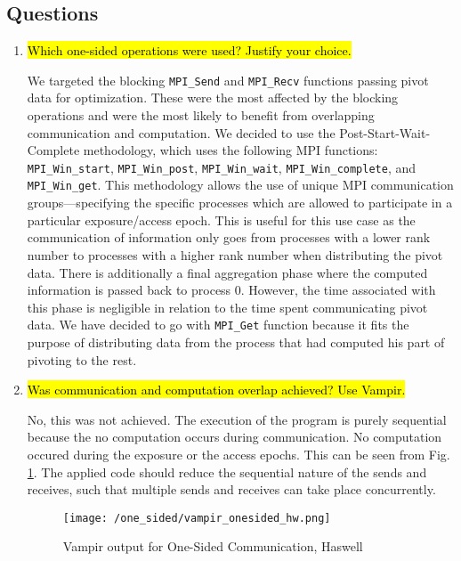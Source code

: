 \subsection{Questions}
\begin{enumerate}
  \item \hl{Which one-sided operations were used? Justify your choice.}

	We targeted the blocking \verb!MPI_Send! and \verb!MPI_Recv! functions passing pivot data for optimization.
	These were the most affected by the blocking operations and were the most likely to benefit from overlapping communication and computation.
    We decided to use the Post-Start-Wait-Complete methodology, which uses the following 
    MPI functions: \verb!MPI_Win_start!, \verb!MPI_Win_post!, \verb!MPI_Win_wait!, \verb!MPI_Win_complete!, and \verb!MPI_Win_get!. 
    This methodology allows the use of unique MPI communication groups---specifying the specific processes which are allowed to participate in a particular exposure/access epoch.
    This is useful for this use case as the communication of information only goes from processes with a lower rank number to processes with a higher rank number when distributing the pivot data.
    There is additionally a final aggregation phase where the computed information is passed back to process 0.
    However, the time associated with this phase is negligible in relation to the time spent communicating pivot data.
    We have decided to go with \verb!MPI_Get! function because it fits the purpose of distributing
    data from the process that had computed his part of pivoting to the rest.

  \item \hl{Was communication and computation overlap achieved? Use Vampir.}

    No, this was not achieved. 
    The execution of the program is purely sequential because the no computation occurs during communication.
    No computation occured during the exposure or the access epochs.
    This can be seen from Fig. \ref{fig:vampir_haswell_one_sided}.
    The applied code should reduce the sequential nature of the sends and receives, such that multiple sends and receives can take place concurrently.
    \begin{figure}[h] %
	\begin{center}
			\texttt{[image: /one\_sided/vampir\_onesided\_hw.png]}
		\caption{Vampir output for One-Sided Communication, Haswell}
		\label{fig:vampir_haswell_one_sided}
	\end{center}
	\end{figure}
	


\end{enumerate}
